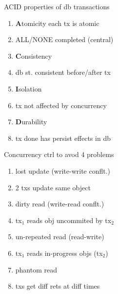 \begin{minipage}{0.5\linewidth}
ACID properties of db transactions
\begin{enumerate}
\item \textbf{A}tomicity each tx is atomic
\item[]ALL/NONE completed (central)
\item \textbf{C}onsistency
\item[]db st. consistent before/after tx
\item \textbf{I}solation
\item[] tx not affected by concurrency
\item \textbf{D}urability
\item[] tx done has persist effects in db
\end{enumerate}
\end{minipage}
\begin{minipage}{0.5\linewidth}
Concurrency ctrl to avod 4 problems
\begin{enumerate}
\item lost update (write-write conflt.)
\item[] 2 txs update same object
\item dirty read (write-read conflt.)
\item[] tx$_{1}$ reads obj uncommited by tx$_{2}$
\item un-repeated read (read-write)
\item[] tx$_{1}$ reads in-progress objs (tx$_{2}$)
\item phantom read
\item[] txs get diff rets at diff times
\end{enumerate}
\end{minipage}
